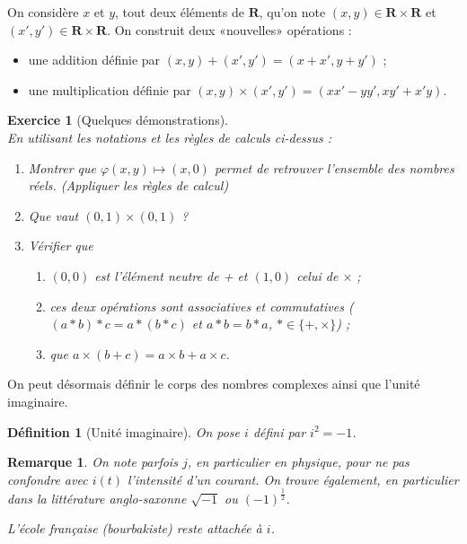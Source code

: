 \documentclass[11pt,a4paper,french]{article}
\newcommand{\R}{\mathbf{R}}
\theoremstyle{break}
\newtheorem{definition}{Définition}
\theoremstyle{plain}
\newtheorem{exerciceT}{Exercice}
\theoremstyle{nonumberplain}
\newtheorem{remarque}{Remarque}
\theoremstyle{nonumberbreak}
\newenvironment{exercice}{\begin{framed}\begin{exerciceT}}{\end{exerciceT}\end{framed}}
\begin{document}
On considère $x$ et $y$, tout deux éléments de $\R$, qu'on note
$(x,y) \in \R \times \R$ et $(x',y') \in \R \times \R$. On construit
deux «nouvelles» opérations :
\begin{itemize}
  \item une addition définie par $(x,y) + (x',y') = (x + x', y + y')$ ;
  \item une multiplication définie par $(x,y) \times (x',y') = (xx' -
    yy', xy' + x'y)$.
\end{itemize}

\begin{exercice}[Quelques démonstrations]~\\
  En utilisant les notations et les règles de calculs ci-dessus :
  \begin{enumerate}
    \item Montrer que $\varphi (x,y) \mapsto (x,0)$ permet de retrouver
      l'ensemble des nombres réels. (Appliquer les règles de calcul)
    \item Que vaut $(0,1)\times (0,1)$ ?
    \item Vérifier que
      \begin{enumerate}
        \item $(0,0)$ est l'élément neutre de + et $(1,0)$ celui de
          $\times$ ;
        \item ces deux opérations sont associatives et commutatives ($(a
          * b) * c = a * (b * c)$ et $a * b = b * a$, $* \in
          \{+,\times\}$) ;
        \item que $a \times ( b + c ) = a \times b + a \times c$.
      \end{enumerate}
  \end{enumerate}
\end{exercice}

On peut désormais définir le corps des nombres complexes ainsi que
l'unité imaginaire.

\begin{definition}[Unité imaginaire]
  On pose $i$ défini par $i^2 = -1$.
\end{definition}

\begin{remarque}
  On note parfois $j$, en particulier en physique, pour ne pas confondre
  avec $i(t)$ l'intensité d'un courant. On trouve également, en
  particulier dans la littérature anglo-saxonne $\sqrt{-1}$ ou
  $(-1)^{\frac12}$.

  L'école française (bourbakiste) reste attachée à $i$.
\end{remarque}
\end{document}
